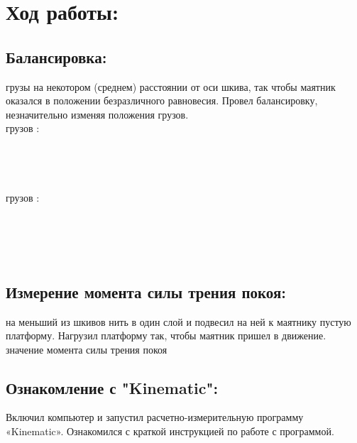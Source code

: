 
\section{\Large Ход работы:}

\subsection{Балансировка:}
 грузы  на  некотором (среднем) расстоянии от оси шкива, так чтобы маятник оказался в положении безразличного равновесия. Провел балансировку, незначительно изменяя положения грузов.\\[0.2]

 грузов :\\[0.1cm]
\\
\\
\\
\\

 грузов :\\[0.1cm]
\\
\\
\\
\\


\subsection{Измерение момента силы трения покоя:}

 на меньший из шкивов нить в один слой и подвесил на ней к маятнику пустую платформу. Нагрузил платформу так, чтобы маятник пришел в движение.\\[0.2]

 значение момента силы трения покоя \\[0.2]

\subsection{Ознакомление с "Kinematic":}

\noindent Включил компьютер и запустил расчетно-измерительную программу «Kinematic». Ознакомился с краткой инструкцией по работе с
программой.

